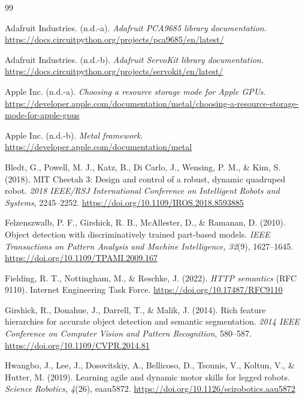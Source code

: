 \documentclass[a4paper,12pt]{report}
\begin{document}
\renewcommand{\bibname}{Reference list}
\setlength{\bibhang}{1.25cm}
\setlength{\bibsep}{0pt}
\begin{thebibliography}{99}

Adafruit Industries. (n.d.-a). \textit{Adafruit PCA9685 library documentation}.
\url{https://docs.circuitpython.org/projects/pca9685/en/latest/}

Adafruit Industries. (n.d.-b). \textit{Adafruit ServoKit library documentation}.
\url{https://docs.circuitpython.org/projects/servokit/en/latest/}

Apple Inc. (n.d.-a). \textit{Choosing a resource storage mode for Apple GPUs}.
\url{
https://developer.apple.com/documentation/metal/choosing-a-resource-storage-mode-for-apple-gpus}

Apple Inc. (n.d.-b). \textit{Metal framework}.
\url{https://developer.apple.com/documentation/metal}

Bledt, G., Powell, M. J., Katz, B., Di Carlo, J., Wensing, P. M., \& Kim, S. (2018).
MIT Cheetah 3: Design and control of a robust, dynamic quadruped robot.
\textit{2018 IEEE/RSJ International Conference on Intelligent Robots and Systems},
2245--2252.
\url{https://doi.org/10.1109/IROS.2018.8593885}

Felzenszwalb, P. F., Girshick, R. B., McAllester, D., \& Ramanan, D. (2010).
Object detection with discriminatively trained part-based models.
\textit{IEEE Transactions on Pattern Analysis and Machine Intelligence, 32}(9), 1627--1645.
\url{https://doi.org/10.1109/TPAMI.2009.167}

Fielding, R. T., Nottingham, M., \& Reschke, J. (2022).
\textit{HTTP semantics} (RFC 9110). Internet Engineering Task Force.
\url{https://doi.org/10.17487/RFC9110}

Girshick, R., Donahue, J., Darrell, T., \& Malik, J. (2014).
Rich feature hierarchies for accurate object detection and semantic segmentation.
\textit{2014 IEEE Conference on Computer Vision and Pattern Recognition}, 580--587.
\url{https://doi.org/10.1109/CVPR.2014.81}

Hwangbo, J., Lee, J., Dosovitskiy, A., Bellicoso, D., Tsounis, V., Koltun, V., \& Hutter, M.
(2019). Learning agile and dynamic motor skills for legged robots.
\textit{Science Robotics, 4}(26), eaau5872.
\url{https://doi.org/10.1126/scirobotics.aau5872}


\end{thebibliography}
\end{document}

